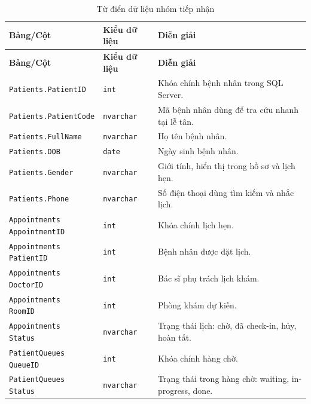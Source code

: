 \documentclass[12pt,a4paper]{article}
\numberwithin{figure}{subsection}
\numberwithin{table}{subsection}
\begin{document}
\begin{longtable}{|p{4.4cm}|p{2.4cm}|p{6.8cm}|}
\caption{Từ điển dữ liệu nhóm tiếp nhận} \\
\hline
\textbf{Bảng/Cột} & \textbf{Kiểu dữ liệu} & \textbf{Diễn giải} \\
\hline
\endfirsthead
\hline
\textbf{Bảng/Cột} & \textbf{Kiểu dữ liệu} & \textbf{Diễn giải} \\
\hline
\endhead
\texttt{Patients.PatientID} & \texttt{int} & Khóa chính bệnh nhân trong SQL Server. \\
\hline
\texttt{Patients.PatientCode} & \texttt{nvarchar} & Mã bệnh nhân dùng để tra cứu nhanh tại lễ tân. \\
\hline
\texttt{Patients.FullName} & \texttt{nvarchar} & Họ tên bệnh nhân. \\
\hline
\texttt{Patients.DOB} & \texttt{date} & Ngày sinh bệnh nhân. \\
\hline
\texttt{Patients.Gender} & \texttt{nvarchar} & Giới tính, hiển thị trong hồ sơ và lịch hẹn. \\
\hline
\texttt{Patients.Phone} & \texttt{nvarchar} & Số điện thoại dùng tìm kiếm và nhắc lịch. \\
\hline
\makecell[l]{\texttt{Appointments}\\\texttt{AppointmentID}} & \texttt{int} & Khóa chính lịch hẹn. \\
\hline
\makecell[l]{\texttt{Appointments}\\\texttt{PatientID}} & \texttt{int} & Bệnh nhân được đặt lịch. \\
\hline
\makecell[l]{\texttt{Appointments}\\\texttt{DoctorID}} & \texttt{int} & Bác sĩ phụ trách lịch khám. \\
\hline
\makecell[l]{\texttt{Appointments}\\\texttt{RoomID}} & \texttt{int} & Phòng khám dự kiến. \\
\hline
\makecell[l]{\texttt{Appointments}\\\texttt{Status}} & \texttt{nvarchar} & Trạng thái lịch: chờ, đã check-in, hủy, hoàn tất. \\
\hline
\makecell[l]{\texttt{PatientQueues}\\\texttt{QueueID}} & \texttt{int} & Khóa chính hàng chờ. \\
\hline
\makecell[l]{\texttt{PatientQueues}\\\texttt{Status}} & \texttt{nvarchar} & Trạng thái trong hàng chờ: waiting, in-progress, done. \\
\hline
\end{longtable}
\end{document}
